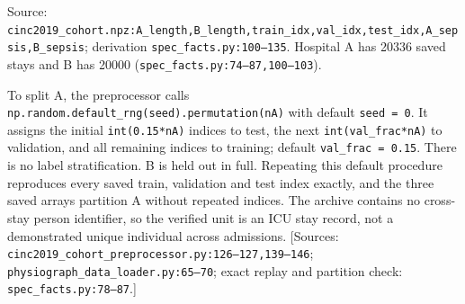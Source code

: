 \begin{center}
\small
{}
\ifdim\wd0>\textwidth\resizebox{\textwidth}{!}{\usebox0}\else\usebox0\fi
\end{center}


Source: \texttt{cinc2019\_\allowbreak{}cohort.\allowbreak{}npz:\allowbreak{}A\_\allowbreak{}length,\allowbreak{}B\_\allowbreak{}length,\allowbreak{}train\_\allowbreak{}idx,\allowbreak{}val\_\allowbreak{}idx,\allowbreak{}test\_\allowbreak{}idx,\allowbreak{}A\_\allowbreak{}sepsis,\allowbreak{}B\_\allowbreak{}sepsis}; derivation \texttt{spec\_\allowbreak{}facts.\allowbreak{}py:\allowbreak{}100–\allowbreak{}135}. Hospital A has 20336 saved stays and B has 20000 (\texttt{spec\_\allowbreak{}facts.\allowbreak{}py:\allowbreak{}74–\allowbreak{}87,\allowbreak{}100–\allowbreak{}103}).

To split A, the preprocessor calls \texttt{np.\allowbreak{}random.\allowbreak{}default\_\allowbreak{}rng(seed).\allowbreak{}permutation(nA)} with default \texttt{seed =\allowbreak{} 0}. It assigns the initial \texttt{int(0.\allowbreak{}15*nA)} indices to test, the next \texttt{int(val\_\allowbreak{}frac*nA)} to validation, and all remaining indices to training; default \texttt{val\_\allowbreak{}frac =\allowbreak{} 0.\allowbreak{}15}. There is no label stratification. B is held out in full. Repeating this default procedure reproduces every saved train, validation and test index exactly, and the three saved arrays partition A without repeated indices. The archive contains no cross-stay person identifier, so the verified unit is an ICU stay record, not a demonstrated unique individual across admissions. [Sources: \texttt{cinc2019\_\allowbreak{}cohort\_\allowbreak{}preprocessor.\allowbreak{}py:\allowbreak{}126–\allowbreak{}127,\allowbreak{}139–\allowbreak{}146}; \texttt{physiograph\_\allowbreak{}data\_\allowbreak{}loader.\allowbreak{}py:\allowbreak{}65–\allowbreak{}70}; exact replay and partition check: \texttt{spec\_\allowbreak{}facts.\allowbreak{}py:\allowbreak{}78–\allowbreak{}87}.]

